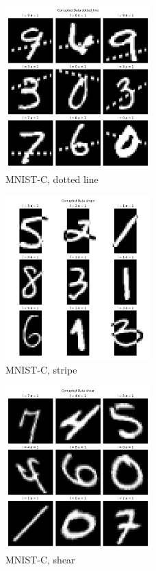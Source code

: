 \begin{figure}[htbp]
    \centerline{\includegraphics[width=0.5\textwidth]{resources/corrupted_data_dotted_line.png}}
    \caption{MNIST-C, dotted line}\label{fig3}
\end{figure}

\begin{figure}[htbp]
    \centerline{\includegraphics[width=0.5\textwidth]{resources/corrupted_data_stripe.png}}
    \caption{MNIST-C, stripe}\label{fig4}
\end{figure}

\begin{figure}[htbp]
    \centerline{\includegraphics[width=0.5\textwidth]{resources/corrupted_data_shear.png}}
    \caption{MNIST-C, shear}\label{fig5}
\end{figure}


